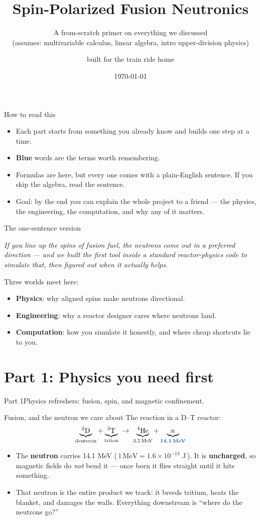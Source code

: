 \documentclass[11pt,aspectratio=169]{beamer}
\title{Spin-Polarized Fusion Neutronics}
\subtitle{A from-scratch primer on everything we discussed\\{\small (assumes: multivariable calculus, linear algebra, intro upper-division physics)}}
\author{built for the train ride home}
\date{\today}
\newcommand{\key}[1]{\textcolor{key}{\textbf{#1}}}
\newcommand{\qq}[1]{\begin{center}\emph{#1}\end{center}}
\begin{document}
\frame{\titlepage}

\begin{frame}{How to read this}
\begin{itemize}
\item Each part starts from something you already know and builds one step at a time.
\item \key{Blue} words are the terms worth remembering.
\item Formulas are here, but every one comes with a plain-English sentence. If you skip the
algebra, read the sentence.
\item Goal: by the end you can explain the whole project to a friend --- the physics, the
engineering, the computation, and why any of it matters.
\end{itemize}
\end{frame}

\begin{frame}{The one-sentence version}
\qq{If you line up the spins of fusion fuel, the neutrons come out in a preferred
direction --- and we built the first tool inside a standard reactor-physics code to simulate
that, then figured out when it actually helps.}
\vfill
Three worlds meet here:
\begin{itemize}
\item \key{Physics}: why aligned spins make neutrons directional.
\item \key{Engineering}: why a reactor designer cares where neutrons land.
\item \key{Computation}: how you simulate it honestly, and where cheap shortcuts lie to you.
\end{itemize}
\end{frame}

\section{Part 1: Physics you need first}
\begin{frame}{Part 1}\Large Physics refreshers: fusion, spin, and magnetic confinement.\end{frame}

\begin{frame}{Fusion, and the neutron we care about}
The reaction in a D--T reactor:
\[ \underbrace{{}^2\mathrm{D}}_{\text{deuteron}} + \underbrace{{}^3\mathrm{T}}_{\text{triton}}
\;\rightarrow\; \underbrace{{}^4\mathrm{He}}_{3.5\,\text{MeV}} +
\underbrace{n}_{\key{14.1\,\text{MeV}}} \]
\begin{itemize}
\item The \key{neutron} carries 14.1 MeV (\,$1\,\text{MeV}=1.6\times10^{-13}$ J\,). It is
\key{uncharged}, so magnetic fields do \emph{not} bend it --- once born it flies straight
until it hits something.
\item That neutron is the entire product we track: it breeds tritium, heats the blanket, and
damages the walls. Everything downstream is ``where do the neutrons go?''
\end{itemize}
\end{frame}
\end{document}

